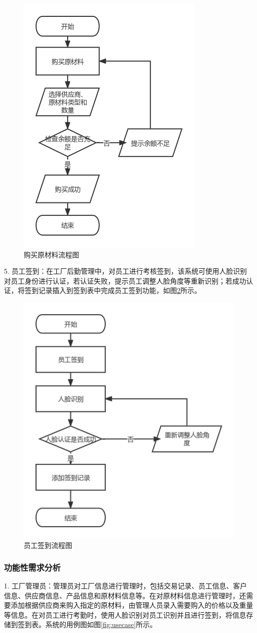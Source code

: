 \begin{figure}[H]
    \centering
    \includegraphics[width=.35\textwidth]{figures/3brmtra.png}
    \caption{购买原材料流程图}
    \label{fig:3brmtra}
\end{figure}

5. 员工签到：在工厂后勤管理中，对员工进行考核签到，该系统可使用人脸识别对员工身份进行认证，若认证失败，提示员工调整人脸角度等重新识别；若成功认证，将签到记录插入到签到表中完成员工签到功能，如图\ref{fig:3fcrcgnt}所示。

\begin{figure}[H]
    \centering
    \includegraphics[width=.45\textwidth]{figures/3fcrcgnt.png}
    \caption{员工签到流程图}
    \label{fig:3fcrcgnt}
\end{figure}

\subsubsection{功能性需求分析}

1. 工厂管理员：管理员对工厂信息进行管理时，包括交易记录、员工信息、客户信息、供应商信息、产品信息和原材料信息等。在对原材料信息进行管理时，还需要添加根据供应商来购入指定的原材料，由管理人员录入需要购入的价格以及重量等信息。在对员工进行考勤时，使用人脸识别对员工识别并且进行签到，将信息存储到签到表。系统的用例图如图\ref{fig:usecase}所示。


